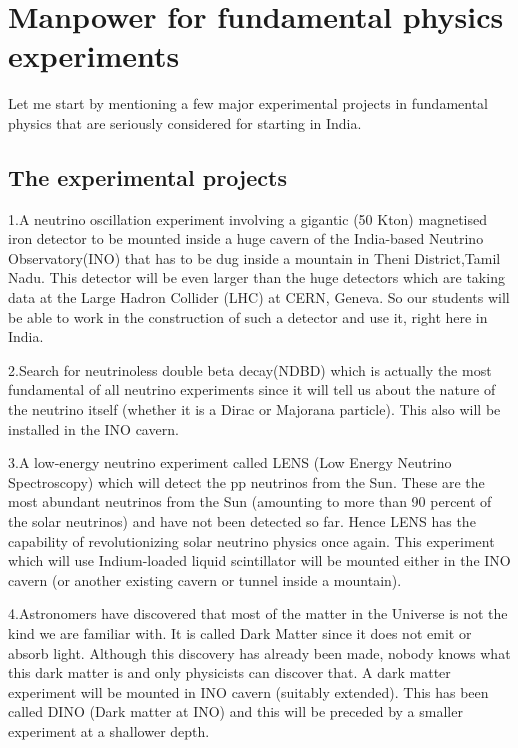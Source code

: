 \chapter{Manpower for fundamental physics experiments}\label{chap18}





  

Let me start by mentioning a few major experimental projects 
in fundamental physics that are seriously considered
for starting in India.

\section*{The experimental projects}

1.A neutrino oscillation experiment involving a gigantic
(50 Kton) magnetised iron detector to be mounted inside
a huge cavern of the India-based Neutrino Observatory(INO)  
that has to be dug inside a mountain in Theni District,Tamil 
Nadu. This detector will be even larger than the huge detectors 
which are taking data at the Large Hadron Collider (LHC) at CERN, 
Geneva. So our students will be able to work in the construction 
of such a detector and use it, right here in India.

2.Search for neutrinoless double beta decay(NDBD) which
is actually the most fundamental of all neutrino experiments
since it will tell us about the nature of the neutrino itself
(whether it is a Dirac or Majorana particle). This also
will be installed in the INO cavern.

3.A low-energy neutrino experiment called LENS (Low Energy
Neutrino Spectroscopy) which will detect the pp neutrinos
from the Sun. These are the most abundant neutrinos from
the Sun (amounting to more than 90 percent of the solar neutrinos) 
and have not been detected so far. Hence LENS has the capability
of revolutionizing solar neutrino physics once again. This
experiment which will use Indium-loaded liquid scintillator 
will be mounted either in the INO cavern (or another
existing cavern or tunnel inside a mountain).

4.Astronomers have discovered that most of the matter in
the Universe is not the kind we are familiar with. It is
called Dark Matter since it does not emit or absorb light.
Although this discovery has already been made, nobody knows
what this dark matter is and only physicists can discover
that. A dark matter experiment will be mounted in INO cavern
(suitably extended). This has been called DINO (Dark matter
at INO) and this will be preceded by a smaller experiment
at a shallower depth. 

